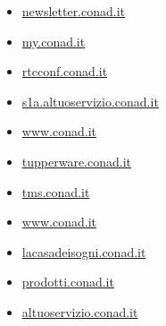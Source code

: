 \documentclass{article}
\begin{document}
\begin{itemize}
        
        
        \item \href{ https://newsletter.conad.it/ }{ newsletter.conad.it }
    
        
        
        \item \href{ https://my.conad.it/login }{ my.conad.it }
    
        
        
        \item \href{ http://rtcconf.conad.it }{ rtcconf.conad.it }
    
        
        
        \item \href{ https://s1a.altuoservizio.conad.it/chiusuratemporanea.html }{ s1a.altuoservizio.conad.it }
    
        
        
        \item \href{ https://www.conad.it/?utm\_source=crm\&utm\_medium=email\&utm\_content=124631197\&utm\_campaign=\_ }{ www.conad.it }
    
        
        
        \item \href{ https://tupperware.conad.it/ }{ tupperware.conad.it }
    
        
        
        \item \href{ https://tms.conad.it/core/framework/login.cfm }{ tms.conad.it }
    
        
        
        \item \href{ https://www.conad.it/servizio-clienti-e-faq?utm\_source=massiva\&utm\_medium=email\&utm\_content=124717596\&utm\_campaign=\_2021\_NON\_CANCELLARE\_Test\_Proof\_Agenzia\&p1=\%2Fnegozio.007471 }{ www.conad.it }
    
        
        
        \item \href{ http://lacasadeisogni.conad.it/ }{ lacasadeisogni.conad.it }
    
        
        
        \item \href{ http://prodotti.conad.it/ }{ prodotti.conad.it }
    
        
        
        \item \href{ https://altuoservizio.conad.it/ }{ altuoservizio.conad.it }
    

\end{itemize}
\end{document}
